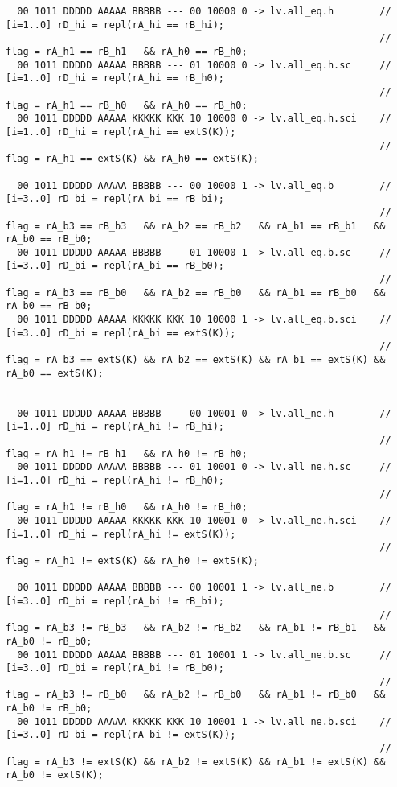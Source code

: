 \begin{landscape}
{\begin{verbatim}
  00 1011 DDDDD AAAAA BBBBB --- 00 10000 0 -> lv.all_eq.h        // [i=1..0] rD_hi = repl(rA_hi == rB_hi);   
                                                                 // flag = rA_h1 == rB_h1   && rA_h0 == rB_h0;
  00 1011 DDDDD AAAAA BBBBB --- 01 10000 0 -> lv.all_eq.h.sc     // [i=1..0] rD_hi = repl(rA_hi == rB_h0);   
                                                                 // flag = rA_h1 == rB_h0   && rA_h0 == rB_h0;
  00 1011 DDDDD AAAAA KKKKK KKK 10 10000 0 -> lv.all_eq.h.sci    // [i=1..0] rD_hi = repl(rA_hi == extS(K)); 
                                                                 // flag = rA_h1 == extS(K) && rA_h0 == extS(K);

  00 1011 DDDDD AAAAA BBBBB --- 00 10000 1 -> lv.all_eq.b        // [i=3..0] rD_bi = repl(rA_bi == rB_bi);   
                                                                 // flag = rA_b3 == rB_b3   && rA_b2 == rB_b2   && rA_b1 == rB_b1   && rA_b0 == rB_b0;
  00 1011 DDDDD AAAAA BBBBB --- 01 10000 1 -> lv.all_eq.b.sc     // [i=3..0] rD_bi = repl(rA_bi == rB_b0);   
                                                                 // flag = rA_b3 == rB_b0   && rA_b2 == rB_b0   && rA_b1 == rB_b0   && rA_b0 == rB_b0;
  00 1011 DDDDD AAAAA KKKKK KKK 10 10000 1 -> lv.all_eq.b.sci    // [i=3..0] rD_bi = repl(rA_bi == extS(K)); 
                                                                 // flag = rA_b3 == extS(K) && rA_b2 == extS(K) && rA_b1 == extS(K) && rA_b0 == extS(K);


  00 1011 DDDDD AAAAA BBBBB --- 00 10001 0 -> lv.all_ne.h        // [i=1..0] rD_hi = repl(rA_hi != rB_hi);   
                                                                 // flag = rA_h1 != rB_h1   && rA_h0 != rB_h0;
  00 1011 DDDDD AAAAA BBBBB --- 01 10001 0 -> lv.all_ne.h.sc     // [i=1..0] rD_hi = repl(rA_hi != rB_h0);   
                                                                 // flag = rA_h1 != rB_h0   && rA_h0 != rB_h0;
  00 1011 DDDDD AAAAA KKKKK KKK 10 10001 0 -> lv.all_ne.h.sci    // [i=1..0] rD_hi = repl(rA_hi != extS(K)); 
                                                                 // flag = rA_h1 != extS(K) && rA_h0 != extS(K);

  00 1011 DDDDD AAAAA BBBBB --- 00 10001 1 -> lv.all_ne.b        // [i=3..0] rD_bi = repl(rA_bi != rB_bi);   
                                                                 // flag = rA_b3 != rB_b3   && rA_b2 != rB_b2   && rA_b1 != rB_b1   && rA_b0 != rB_b0;
  00 1011 DDDDD AAAAA BBBBB --- 01 10001 1 -> lv.all_ne.b.sc     // [i=3..0] rD_bi = repl(rA_bi != rB_b0);   
                                                                 // flag = rA_b3 != rB_b0   && rA_b2 != rB_b0   && rA_b1 != rB_b0   && rA_b0 != rB_b0;
  00 1011 DDDDD AAAAA KKKKK KKK 10 10001 1 -> lv.all_ne.b.sci    // [i=3..0] rD_bi = repl(rA_bi != extS(K)); 
                                                                 // flag = rA_b3 != extS(K) && rA_b2 != extS(K) && rA_b1 != extS(K) && rA_b0 != extS(K);
\end{verbatim}

}
\end{landscape}
